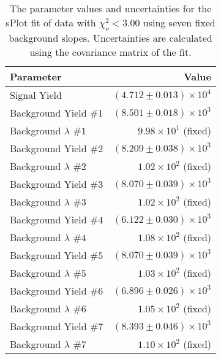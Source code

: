 
\begin{table}[ht]
    \begin{center}
        \begin{tabular}{lr}\toprule
            Parameter & Value \\\midrule
            Signal Yield & $(4.712 \pm 0.013) \times 10^{4}$ \\
            Background Yield $\#1$ & $(8.501 \pm 0.018) \times 10^{3}$ \\
            Background $\lambda$ $\#1$ & $9.98 \times 10^{1}$ (fixed) \\
            Background Yield $\#2$ & $(8.209 \pm 0.038) \times 10^{3}$ \\
            Background $\lambda$ $\#2$ & $1.02 \times 10^{2}$ (fixed) \\
            Background Yield $\#3$ & $(8.070 \pm 0.039) \times 10^{3}$ \\
            Background $\lambda$ $\#3$ & $1.02 \times 10^{2}$ (fixed) \\
            Background Yield $\#4$ & $(6.122 \pm 0.030) \times 10^{3}$ \\
            Background $\lambda$ $\#4$ & $1.08 \times 10^{2}$ (fixed) \\
            Background Yield $\#5$ & $(8.070 \pm 0.039) \times 10^{3}$ \\
            Background $\lambda$ $\#5$ & $1.03 \times 10^{2}$ (fixed) \\
            Background Yield $\#6$ & $(6.896 \pm 0.026) \times 10^{3}$ \\
            Background $\lambda$ $\#6$ & $1.05 \times 10^{2}$ (fixed) \\
            Background Yield $\#7$ & $(8.393 \pm 0.046) \times 10^{3}$ \\
            Background $\lambda$ $\#7$ & $1.10 \times 10^{2}$ (fixed) \\\bottomrule
        \end{tabular}
        \caption{The parameter values and uncertainties for the sPlot fit of data with $\chi^2_\nu < 3.00$ using seven fixed background slopes. Uncertainties are calculated using the covariance matrix of the fit.}\label{tab:splot-fit-results-chisqdof-3.00-fixed-7}
    \end{center}
\end{table}
